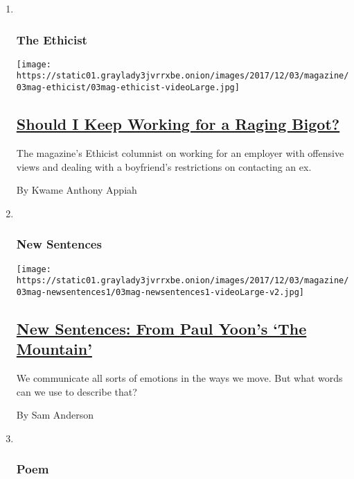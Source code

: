 \begin{enumerate}
\def\labelenumi{\arabic{enumi}.}
\item ~
  \hypertarget{the-ethicist}{%
  \subsubsection{The Ethicist}\label{the-ethicist}}

  \texttt{[image: https://static01.graylady3jvrrxbe.onion/images/2017/12/03/magazine/03mag-ethicist/03mag-ethicist-videoLarge.jpg]}

  \hypertarget{should-i-keep-working-for-a-raging-bigot}{%
  \subsection{\texorpdfstring{\href{/2017/11/29/magazine/should-i-keep-working-for-a-raging-bigot.html}{Should
  I Keep Working for a Raging
  Bigot?}}{Should I Keep Working for a Raging Bigot?}}\label{should-i-keep-working-for-a-raging-bigot}}

  The magazine's Ethicist columnist on working for an employer with
  offensive views and dealing with a boyfriend's restrictions on
  contacting an ex.

  By Kwame Anthony Appiah
\item ~
  \hypertarget{new-sentences}{%
  \subsubsection{New Sentences}\label{new-sentences}}

  \texttt{[image: https://static01.graylady3jvrrxbe.onion/images/2017/12/03/magazine/03mag-newsentences1/03mag-newsentences1-videoLarge-v2.jpg]}

  \hypertarget{new-sentences-from-paul-yoons-the-mountain}{%
  \subsection{\texorpdfstring{\href{/2017/12/01/magazine/new-sentences-from-paul-yoons-the-mountain.html}{New
  Sentences: From Paul Yoon's `The
  Mountain'}}{New Sentences: From Paul Yoon's `The Mountain'}}\label{new-sentences-from-paul-yoons-the-mountain}}

  We communicate all sorts of emotions in the ways we move. But what
  words can we use to describe that?

  By Sam Anderson
\item ~
  \hypertarget{poem}{%
  \subsubsection{Poem}\label{poem}}


\end{enumerate}
